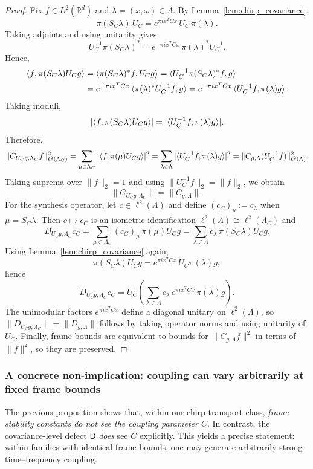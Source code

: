 \documentclass[final,1p,times,authoryear]{elsarticle}
\theoremstyle{definition}
\newcommand{\R}{\mathbb{R}}
\newcommand{\1}{\mathbf{1}}
\DeclarePairedDelimiter{\inner}{\langle}{\rangle}
\begin{document}
\begin{proof}
Fix $f\in L^2(\R^d)$ and $\lambda=(x,\omega)\in\Lambda$. By Lemma~\ref{lem:chirp_covariance},
$$
\pi(S_C\lambda)\,U_C
=
e^{\pi i x^TCx}\,U_C\,\pi(\lambda).
$$
Taking adjoints and using unitarity gives
$$
U_C^{-1}\pi(S_C\lambda)^*
=
e^{-\pi i x^TCx}\,\pi(\lambda)^*U_C^{-1}.
$$
Hence,
\begin{align*}
\inner{f,\pi(S_C\lambda)U_C g}
&=\inner{\pi(S_C\lambda)^*f, U_C g}
=\inner{U_C^{-1}\pi(S_C\lambda)^*f, g}\\
&=
e^{-\pi i x^TCx}\,\inner{\pi(\lambda)^*U_C^{-1}f, g}
=
e^{-\pi i x^TCx}\,\inner{U_C^{-1}f,\pi(\lambda)g}.
\end{align*}
Taking moduli,
$$
|\inner{f,\pi(S_C\lambda)U_C g}|
=
|\inner{U_C^{-1}f,\pi(\lambda)g}|.
$$
Therefore,
$$
\|C_{U_C g,\Lambda_C} f\|_{\ell^2(\Lambda_C)}^2
=
\sum_{\mu\in\Lambda_C}|\inner{f,\pi(\mu)U_C g}|^2
=
\sum_{\lambda\in\Lambda}|\inner{U_C^{-1}f,\pi(\lambda)g}|^2
=
\|C_{g,\Lambda}(U_C^{-1}f)\|_{\ell^2(\Lambda)}^2.
$$
Taking suprema over $\|f\|_2=1$ and using $\|U_C^{-1}f\|_2=\|f\|_2$, we obtain
$$
\|C_{U_C g,\Lambda_C}\|
=
\|C_{g,\Lambda}\|.
$$
For the synthesis operator, let $c\in\ell^2(\Lambda)$ and define $(c_C)_{\mu}:=c_\lambda$ when $\mu=S_C\lambda$.
Then $c\mapsto c_C$ is an isometric identification $\ell^2(\Lambda)\cong \ell^2(\Lambda_C)$ and
$$
D_{U_C g,\Lambda_C} c_C
=
\sum_{\mu\in\Lambda_C} (c_C)_\mu\,\pi(\mu)U_C g
=
\sum_{\lambda\in\Lambda} c_\lambda\,\pi(S_C\lambda)U_C g.
$$
Using Lemma~\ref{lem:chirp_covariance} again,
$$
\pi(S_C\lambda)U_C g
=
e^{\pi i x^TCx}\,U_C\pi(\lambda)g,
$$
hence
$$
D_{U_C g,\Lambda_C} c_C
=
U_C\left(\sum_{\lambda\in\Lambda} c_\lambda\,e^{\pi i x^TCx}\,\pi(\lambda)g\right).
$$
The unimodular factors $e^{\pi i x^TCx}$ define a diagonal unitary on $\ell^2(\Lambda)$, so
$\|D_{U_C g,\Lambda_C}\|=\|D_{g,\Lambda}\|$ follows by taking operator norms and using unitarity of $U_C$.
Finally, frame bounds are equivalent to bounds for $\|C_{g,\Lambda}f\|^2$ in terms of $\|f\|^2$, so they are preserved.
\end{proof}

\subsubsection{A concrete non-implication: coupling can vary arbitrarily at fixed frame bounds}
The previous proposition shows that, within our chirp-transport class, \emph{frame stability constants do not see the coupling parameter $C$}.
In contrast, the covariance-level defect $\mathsf D$ \emph{does} see $C$ explicitly.
This yields a precise statement: within families with identical frame bounds, one may generate arbitrarily strong
time--frequency coupling.
\end{document}
